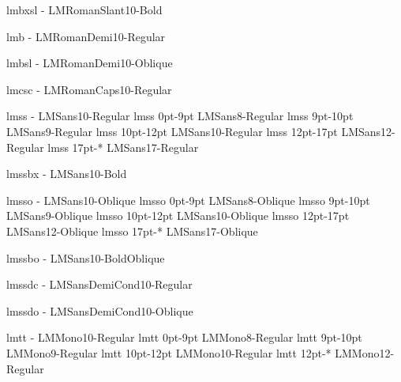 \registertfm lmbxsl     -      LMRomanSlant10-Bold\LMfeat{}

\registertfm lmb        -      LMRomanDemi10-Regular\LMfeat{}

\registertfm lmbsl      -      LMRomanDemi10-Oblique\LMfeat{}

\registertfm lmcsc      -      LMRomanCaps10-Regular\LMfeat{}

\setfonts[LMRoman/]



\registertfm lmss       -      LMSans10-Regular\LMfeat{}
\registertfm lmss    0pt-9pt   LMSans8-Regular\LMfeat{}
\registertfm lmss    9pt-10pt  LMSans9-Regular\LMfeat{}
\registertfm lmss   10pt-12pt  LMSans10-Regular\LMfeat{}
\registertfm lmss   12pt-17pt  LMSans12-Regular\LMfeat{}
\registertfm lmss   17pt-*     LMSans17-Regular\LMfeat{}

\registertfm lmssbx     -      LMSans10-Bold\LMfeat{}

\registertfm lmsso      -      LMSans10-Oblique\LMfeat{}
\registertfm lmsso   0pt-9pt   LMSans8-Oblique\LMfeat{}
\registertfm lmsso   9pt-10pt  LMSans9-Oblique\LMfeat{}
\registertfm lmsso  10pt-12pt  LMSans10-Oblique\LMfeat{}
\registertfm lmsso  12pt-17pt  LMSans12-Oblique\LMfeat{}
\registertfm lmsso  17pt-*     LMSans17-Oblique\LMfeat{}

\registertfm lmssbo     -      LMSans10-BoldOblique\LMfeat{}



\registertfm lmssdc     -      LMSansDemiCond10-Regular\LMfeat{}

\registertfm lmssdo     -      LMSansDemiCond10-Oblique\LMfeat{}



\registertfm lmtt       -      LMMono10-Regular\LMfeat{}
\registertfm lmtt    0pt-9pt   LMMono8-Regular\LMfeat{}
\registertfm lmtt    9pt-10pt  LMMono9-Regular\LMfeat{}
\registertfm lmtt   10pt-12pt  LMMono10-Regular\LMfeat{}
\registertfm lmtt   12pt-*     LMMono12-Regular\LMfeat{}

